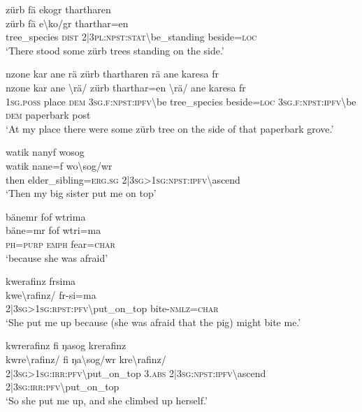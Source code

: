 \ea\label{ex:14:a2958}
zürb fä ekogr thartharen\\
\gll zürb	fä	e{\textbackslash}ko/gr	tharthar=en\\
     tree\_species	\textsc{dist}	2|3\textsc{pl}:\textsc{npst}:\textsc{stat}{\textbackslash}be\_standing	beside=\textsc{loc}\\
\glt `There stood some zürb trees standing on the side.'
\z

\ea\label{ex:14:a2959}
nzone kar ane rä zürb thartharen rä ane karesa fr\\
\gll nzone	kar	ane	{\textbackslash}rä/	zürb	tharthar=en	{\textbackslash}rä/	ane	karesa	fr\\
     1\textsc{sg}.\textsc{poss}	place	\textsc{dem}	3\textsc{sg}.\textsc{f}:\textsc{npst}:\textsc{ipfv}{\textbackslash}be	tree\_species	beside=\textsc{loc}	3\textsc{sg}.\textsc{f}:\textsc{npst}:\textsc{ipfv}{\textbackslash}be	\textsc{dem}	paperbark	post\\
\glt `At my place there were some zürb tree on the side of that paperbark grove.'
\z

\ea\label{ex:14:a2961}
watik nanyf wosog\\
\gll watik	nane=f	wo{\textbackslash}sog/wr\\
     then	elder\_sibling=\textsc{erg}.\textsc{sg}	2|3\textsc{sg}>1\textsc{sg}:\textsc{npst}:\textsc{ipfv}{\textbackslash}ascend\\
\glt `Then my big sister put me on top'
\z

\newpage
\ea\label{ex:14:a2963}
bänemr fof wtrima\\
\gll bäne=mr	fof	wtri=ma\\
     \textsc{ph}=\textsc{purp}	\textsc{emph}	fear=\textsc{char}\\
\glt `because she was afraid'
\z

\ea\label{ex:14:a2965}
kwerafinz frsima\\
\gll kwe{\textbackslash}rafinz/	fr-si=ma\\
     2|3\textsc{sg}>1\textsc{sg}:\textsc{rpst}:\textsc{pfv}{\textbackslash}put\_on\_top	bite-\textsc{nmlz}=\textsc{char}\\
\glt `She put me up because (she was afraid that the pig) might bite me.'
\z

\ea\label{ex:14:a2967}
kwrerafinz fi ŋasog krerafinz\\
\gll kwre{\textbackslash}rafinz/	fi	ŋa{\textbackslash}sog/wr	kre{\textbackslash}rafinz/\\
     2|3\textsc{sg}>1\textsc{sg}:\textsc{irr}:\textsc{pfv}{\textbackslash}put\_on\_top	3.\textsc{abs}	2|3\textsc{sg}:\textsc{npst}:\textsc{ipfv}{\textbackslash}ascend	2|3\textsc{sg}:\textsc{irr}:\textsc{pfv}{\textbackslash}put\_on\_top\\
\glt `So she put me up, and she climbed up herself.'
\z

